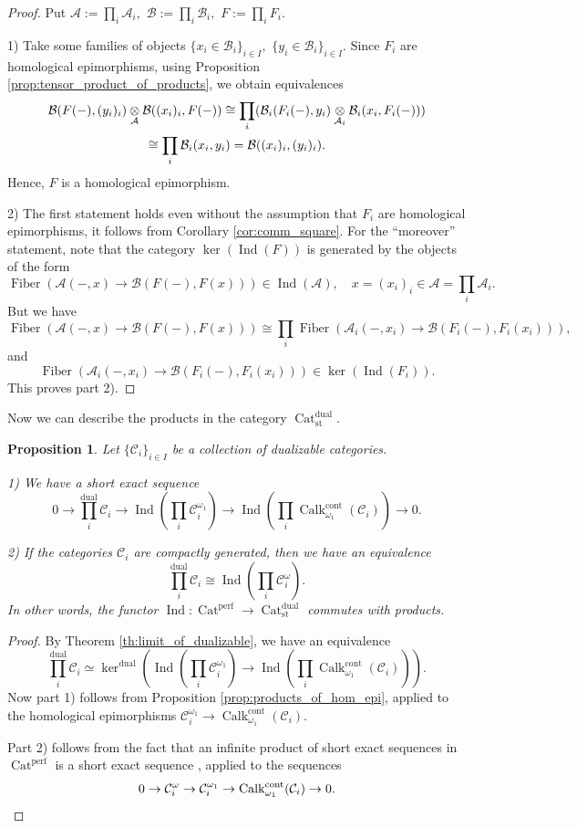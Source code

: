 \documentclass[11pt,leqno]{amsart}
\newtheorem{prop}[theo]{Proposition}
\numberwithin{equation}{section}
\newcommand{\tens}[1]{%
  \mathbin{\mathop{\otimes}\displaylimits_{#1}}%
}
\newcommand{\Cat}{\operatorname{Cat}}
\newcommand{\Fiber}{\operatorname{Fiber}}
\newcommand{\cont}{\operatorname{cont}}
\newcommand{\st}{\operatorname{st}}
\newcommand{\dual}{\operatorname{dual}}
\newcommand{\cA}{{\mathcal A}}
\newcommand{\cB}{{\mathcal B}}
\newcommand{\cC}{{\mathcal C}}
\newcommand{\perf}{\operatorname{perf}}
\newcommand{\Ind}{\operatorname{Ind}}
\newcommand{\Calk}{\operatorname{Calk}}
\begin{document}
\begin{proof} Put $\cA:=\prod_i\cA_i,$ $\cB:=\prod_i\cB_i,$ $F:=\prod_i F_i.$ 

1) Take some families of objects $\{x_i\in\cB_i\}_{i\in I},$ $\{y_i\in\cB_i\}_{i\in I}.$ Since $F_i$ are homological epimorphisms, using Proposition \ref{prop:tensor_product_of_products}, we obtain equivalences
\begin{multline*}\cB(F(-),(y_i)_i)\tens{\cA}\cB((x_i)_i,F(-))\cong \prod_i(\cB_i(F_i(-),y_i)\tens{\cA_i}\cB_i(x_i,F_i(-)))\\ \cong
 \prod_i\cB_i(x_i,y_i)=\cB((x_i)_i,(y_i)_i).\end{multline*}
Hence, $F$ is a homological epimorphism.

2) The first statement holds even without the assumption that $F_i$ are homological epimorphisms, it follows from Corollary \ref{cor:comm_square}. For the ``moreover'' statement, note that the category $\ker(\Ind(F))$ is generated by the objects of the form $$\Fiber(\cA(-,x)\to\cB(F(-),F(x)))\in\Ind(\cA),\quad x=(x_i)_i\in\cA=\prod_i\cA_i.$$ But we have
$$\Fiber(\cA(-,x)\to\cB(F(-),F(x)))\cong\prod_i \Fiber(\cA_i(-,x_i)\to\cB(F_i(-),F_i(x_i))),$$ and $$\Fiber(\cA_i(-,x_i)\to\cB(F_i(-),F_i(x_i)))\in\ker(\Ind(F_i)).$$ This proves part 2).
\end{proof}

Now we can describe the products in the category $\Cat_{\st}^{\dual}.$

\begin{prop}\label{prop:products_in_Cat^dual} Let $\{\cC_i\}_{i\in I}$ be a collection of dualizable categories.

1) We have a short exact sequence \begin{equation}\label{eq:exact_seq_for_product}0\to\prod_i^{\dual}\cC_i\to\Ind(\prod_i\cC_i^{\omega_1})\to\Ind(\prod_i\Calk_{\omega_1}^{\cont}(\cC_i))\to 0.\end{equation}

2) If the categories $\cC_i$ are compactly generated, then we have an equivalence $$\prod_i^{\dual}\cC_i\cong\Ind(\prod_i\cC_i^{\omega}).$$
In other words, the functor $\Ind:\Cat^{\perf}\to\Cat_{\st}^{\dual}$ commutes with products.
\end{prop}

\begin{proof}By Theorem \ref{th:limit_of_dualizable}, we have an equivalence $$\prod_i^{\dual}\cC_i\simeq\ker^{\dual}(\Ind(\prod_i\cC_i^{\omega_1})\to\Ind(\prod_i\Calk_{\omega_1}^{\cont}(\cC_i))).$$
Now part 1) follows from Proposition \ref{prop:products_of_hom_epi}, applied to the homological epimorphisms $\cC_i^{\omega_1}\to\Calk_{\omega_1}^{\cont}(\cC_i).$

Part 2) follows from the fact that an infinite product of short exact sequences in $\Cat^{\perf}$ is a short exact sequence \cite[Lemma 5.2]{KW19}, applied to the sequences
\begin{equation*}0\to\cC_i^{\omega}\to\cC_i^{\omega_1}\to\Calk_{\omega_1}^{\cont}(\cC_i)\to 0.\qedhere\end{equation*}\end{proof}
\end{document}
